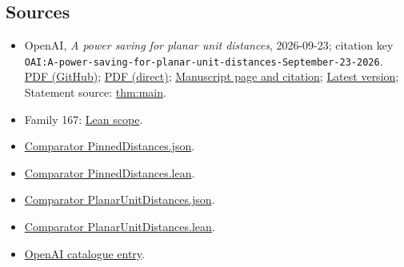 \documentclass[11pt]{article}
\begin{document}
\subsection{Sources}
\begin{itemize}
\item OpenAI, \emph{A power saving for planar unit distances}, 2026-09-23; citation key \texttt{OAI:A-power-saving-for-planar-unit-distances-September-23-2026}. \href{https://github.com/openai/math/blob/adc7f1241b42e322a6451854ab7e4b4c146bf78a/preprints/A-power-saving-for-planar-unit-distances-September-23-2026/paper.pdf}{PDF (GitHub)}; \href{https://github.com/openai/math/raw/adc7f1241b42e322a6451854ab7e4b4c146bf78a/preprints/A-power-saving-for-planar-unit-distances-September-23-2026/paper.pdf}{PDF (direct)}; \href{https://github.com/openai/math/blob/adc7f1241b42e322a6451854ab7e4b4c146bf78a/preprints/A-power-saving-for-planar-unit-distances-September-23-2026/README.md}{Manuscript page and citation}; \href{https://github.com/openai/math/blob/main/preprints/A-power-saving-for-planar-unit-distances-September-23-2026/paper.pdf}{Latest version}; Statement source: \href{https://github.com/openai/math/blob/adc7f1241b42e322a6451854ab7e4b4c146bf78a/preprints/A-power-saving-for-planar-unit-distances-September-23-2026/build/sections/00-introduction.tex\#L12}{thm:main}.
\item Family 167: \href{https://github.com/openai/math/blob/adc7f1241b42e322a6451854ab7e4b4c146bf78a/lean/docs/167.md}{Lean scope}.
\item \href{https://github.com/openai/math/blob/adc7f1241b42e322a6451854ab7e4b4c146bf78a/lean/ComparatorChallenges/PinnedDistances.json}{Comparator PinnedDistances.json}.
\item \href{https://github.com/openai/math/blob/adc7f1241b42e322a6451854ab7e4b4c146bf78a/lean/ComparatorChallenges/PinnedDistances.lean}{Comparator PinnedDistances.lean}.
\item \href{https://github.com/openai/math/blob/adc7f1241b42e322a6451854ab7e4b4c146bf78a/lean/ComparatorChallenges/PlanarUnitDistances.json}{Comparator PlanarUnitDistances.json}.
\item \href{https://github.com/openai/math/blob/adc7f1241b42e322a6451854ab7e4b4c146bf78a/lean/ComparatorChallenges/PlanarUnitDistances.lean}{Comparator PlanarUnitDistances.lean}.
\item \href{https://github.com/openai/math/blob/adc7f1241b42e322a6451854ab7e4b4c146bf78a/CONTENTS.md}{OpenAI catalogue entry}.
\end{itemize}
\end{document}
